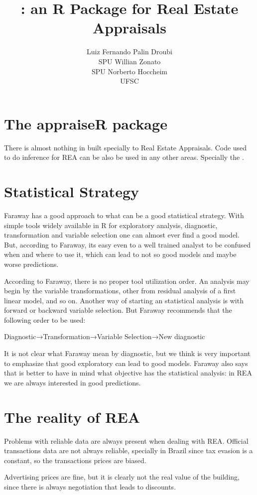 \documentclass[article]{jss}
\author{
Luiz Fernando Palin Droubi\\SPU \And Willian Zonato\\SPU \And Norberto Hoccheim\\UFSC
}
\title{\pkg{appraiseR}: an R Package for Real Estate Appraisals}
\begin{document}
\section{The appraiseR package}\label{the-appraiser-package}

There is almost nothing in  built specially to Real
Estate Appraisals. Code used to do inference for REA can be also be used
in any other areas. Specially the .

\section{Statistical Strategy}\label{statistical-strategy}

Faraway \citeyearpar[p.57]{faraway2004linear} has a good approach to
what can be a good statistical strategy. With simple tools widely
available in R for exploratory analysis, diagnostic, transformation and
variable selection one can almost ever find a good model. But, according
to Faraway, its easy even to a well trained analyst to be confused when
and where to use it, which can lead to not so good models and maybe
worse predictions.

According to Faraway, there is no proper tool utilization order. An
analysis may begin by the variable transformations, other from residual
analysis of a first linear model, and so on. Another way of starting an
statistical analysis is with forward or backward variable selection. But
Faraway recommends that the following order to be used:

Diagnostic→Transformation→Variable Selection→New diagnostic

It is not clear what Faraway mean by diagnostic, but we think is very
important to emphasize that good exploratory can lead to good models.
Faraway also says that is better to have in mind what objective has the
statistical analysis: in REA we are always interested in good
predictions.

\section{The reality of REA}\label{the-reality-of-rea}

Problems with reliable data are always present when dealing with REA.
Official transactions data are not always reliable, specially in Brazil
since tax evasion is a constant, so the transactions prices are biased.

Advertising prices are fine, but it is clearly not the real value of the
building, since there is always negotiation that leads to discounts.
\end{document}

